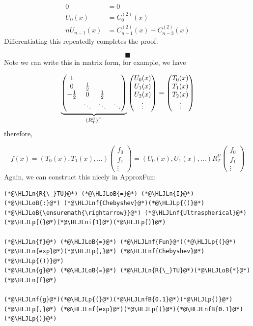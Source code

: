 \documentclass[12pt,a4paper]{article}
\newcommand{\HLJLn}[1]{#1}
\newcommand{\HLJLnf}[1]{\textcolor[RGB]{66,102,213}{#1}}
\newcommand{\HLJLnfB}[1]{\textcolor[RGB]{59,151,46}{#1}}
\newcommand{\HLJLni}[1]{\textcolor[RGB]{59,151,46}{#1}}
\newcommand{\HLJLoB}[1]{\textcolor[RGB]{102,102,102}{\textbf{#1}}}
\newcommand{\HLJLp}[1]{#1}
\begin{document}
\begin{align*}
    0 &= 0\\
    U_0(x) &= C_0^{(2)}(x) \\
   n U_{n-1}(x) &= C_{n-1}^{(2)}(x)  - C_{n-3}^{(2)}(x)
\end{align*}
Differentiating this repeatedly completes the proof.

\[
\blacksquare
\]
Note we can write this in matrix form, for example, we have

\[
\underbrace{\begin{pmatrix}1 \cr
                    0 & {1\over 2}\cr
                       -{1\over 2} & 0 & {1\over 2} \cr
                           &\ddots &\ddots & \ddots\end{pmatrix} }_{(R_T^U)^\top} \begin{pmatrix}
                           U_0(x) \\ U_1(x) \\ U_2(x) \\ \vdots \end{pmatrix}  =  \begin{pmatrix} T_0(x) \\ T_1(x) \\ T_2(x) \\ \vdots \end{pmatrix}
\]
therefore,

\[
f(x) =  (T_0(x),T_1(x),\ldots) \begin{pmatrix} f_0\\f_1\\\vdots \end{pmatrix} =  (U_0(x),U_1(x),\ldots) R_T^U \begin{pmatrix} f_0\\f_1\\\vdots \end{pmatrix}
\]
Again, we can construct this nicely in ApproxFun:


\begin{lstlisting}
(*@\HLJLn{R{\_}TU}@*) (*@\HLJLoB{=}@*) (*@\HLJLn{I}@*) (*@\HLJLoB{:}@*) (*@\HLJLnf{Chebyshev}@*)(*@\HLJLp{()}@*) (*@\HLJLoB{\ensuremath{\rightarrow}}@*) (*@\HLJLnf{Ultraspherical}@*)(*@\HLJLp{(}@*)(*@\HLJLni{1}@*)(*@\HLJLp{)}@*)

(*@\HLJLn{f}@*) (*@\HLJLoB{=}@*) (*@\HLJLnf{Fun}@*)(*@\HLJLp{(}@*)(*@\HLJLn{exp}@*)(*@\HLJLp{,}@*) (*@\HLJLnf{Chebyshev}@*)(*@\HLJLp{())}@*)
(*@\HLJLn{g}@*) (*@\HLJLoB{=}@*) (*@\HLJLn{R{\_}TU}@*)(*@\HLJLoB{*}@*)(*@\HLJLn{f}@*)

(*@\HLJLnf{g}@*)(*@\HLJLp{(}@*)(*@\HLJLnfB{0.1}@*)(*@\HLJLp{)}@*) (*@\HLJLp{,}@*) (*@\HLJLnf{exp}@*)(*@\HLJLp{(}@*)(*@\HLJLnfB{0.1}@*)(*@\HLJLp{)}@*)
\end{lstlisting}
\end{document}
